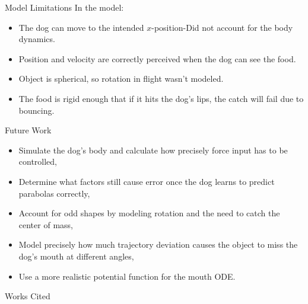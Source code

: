 \documentclass[compress,12pt,mp]{beamer}
\begin{document}
\begin{frame}[t]{Model Limitations}
In the model:
    \begin{itemize}
        \item The dog can move to the intended $x$-position-Did not account for the body dynamics.
        \item Position and velocity are correctly perceived when the dog can see the food.
        \item Object is spherical, so rotation in flight wasn't modeled.
        \item The food is rigid enough that if it hits the dog's lips, the catch will fail due to bouncing.
    \end{itemize}
    
\end{frame}
\begin{frame}[t]{Future Work}
\begin{itemize}
\item Simulate the dog's body and calculate how precisely force input has to be controlled,
\item Determine what factors still cause error once the dog learns to predict parabolas correctly,
\item Account for odd shapes by modeling rotation and the need to catch the center of mass,
\item Model precisely how much trajectory deviation causes the object to miss the dog's mouth at different angles,
\item Use a more realistic potential function for the mouth ODE.
\end{itemize}
\end{frame}

\nocite{*}
\begin{frame}[t, allowframebreaks]{Works Cited}


\end{frame}
\end{document}
